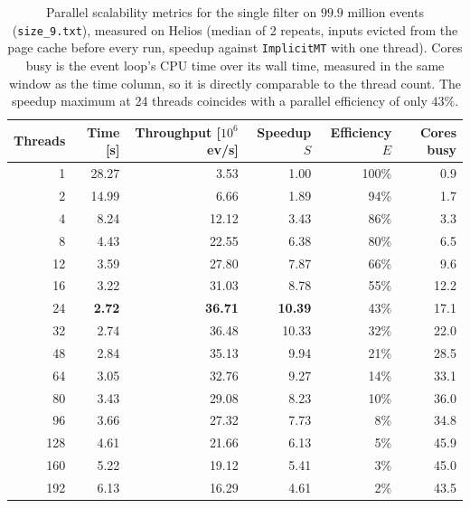 \begin{table}[htbp]
\centering
\caption{Parallel scalability metrics for the single filter on $99.9$ million events (\texttt{size\_9.txt}), measured on Helios (median of 2 repeats, inputs evicted from the page cache before every run, speedup against \texttt{ImplicitMT} with one thread). Cores busy is the event loop's CPU time over its wall time, measured in the same window as the time column, so it is directly comparable to the thread count. The speedup maximum at 24 threads coincides with a parallel efficiency of only $43\%$.}
\label{tab:scalability-filter}
\begin{tabular}{rrrrrr}
\toprule
Threads & Time [s] & Throughput [$10^6$ ev/s] & Speedup $S$ & Efficiency $E$ & Cores busy \\
\midrule
 1 & 28.27 & 3.53 & 1.00 & 100\% & 0.9 \\
 2 & 14.99 & 6.66 & 1.89 & 94\% & 1.7 \\
 4 & 8.24 & 12.12 & 3.43 & 86\% & 3.3 \\
 8 & 4.43 & 22.55 & 6.38 & 80\% & 6.5 \\
12 & 3.59 & 27.80 & 7.87 & 66\% & 9.6 \\
16 & 3.22 & 31.03 & 8.78 & 55\% & 12.2 \\
24 & \textbf{2.72} & \textbf{36.71} & \textbf{10.39} & 43\% & 17.1 \\
32 & 2.74 & 36.48 & 10.33 & 32\% & 22.0 \\
48 & 2.84 & 35.13 & 9.94 & 21\% & 28.5 \\
64 & 3.05 & 32.76 & 9.27 & 14\% & 33.1 \\
80 & 3.43 & 29.08 & 8.23 & 10\% & 36.0 \\
96 & 3.66 & 27.32 & 7.73 & 8\% & 34.8 \\
128 & 4.61 & 21.66 & 6.13 & 5\% & 45.9 \\
160 & 5.22 & 19.12 & 5.41 & 3\% & 45.0 \\
192 & 6.13 & 16.29 & 4.61 & 2\% & 43.5 \\
\bottomrule
\end{tabular}
\end{table}
